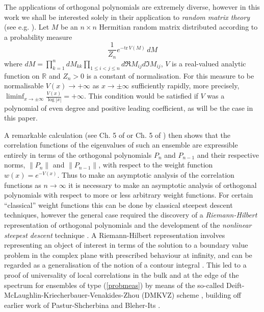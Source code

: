 \documentclass[12pt]{article}
\theoremstyle{definition}
\begin{document}
The applications of orthogonal polynomials are extremely diverse, however in this work we shall be interested solely in their application to \textit{random matrix theory} (see e.g. \cite{deiftbook}). Let $M$ be an $n\times n$ Hermitian random matrix distributed according to a probability measure
\begin{equation}\label{probmeas}
\frac{1}{Z_n} e^{- \mathrm{tr} \, V(M)} \, dM
\end{equation}
where $dM = \prod_{k=1}^n dM_{kk} \prod_{1 \leq i < j \leq n} d \Re M_{ij} d \Im M_{ij}$,  $V$ is a real-valued analytic function on $\mathbb{R}$ and $Z_n > 0$ is a constant of normalisation. For this measure to be normalisable $V(x) \to +\infty$ as $x \to \pm \infty$ sufficiently rapidly,  more precisely, $\liminf_{x \to \pm \infty} \frac{V(x)}{\log|x|} = +\infty$. This condition would be satisfied if $V$ was a polynomial of even degree and positive leading coefficient, as will be the case in this paper. 

A remarkable calculation (see Ch. 5 of \cite{mehta} or Ch. 5 of \cite{loggases}) then shows that the correlation functions of the eigenvalues of such an ensemble are expressible entirely in terms of the orthogonal polynomials $P_n$ and $P_{n-1}$ and their respective norms, $\| P_n \|$ and $\| P_{n-1} \|$, with respect to the weight function $w(x) = e^{-V(x)}$. Thus to make an asymptotic analysis of the correlation functions as $n \to \infty$ it is necessary to make an asymptotic analysis of orthogonal polynomials with respect to more or less arbitrary weight functions. For certain \enquote{classical} weight functions this can be done by classical steepest descent techniques, however the general case required the discovery of a \textit{Riemann-Hilbert} representation of orthogonal polynomials \cite{fokas} and the development of the \textit{nonlinear steepest descent} technique \cite{10.2307/2946540}.  A Riemann-Hilbert representation involves representing an object of interest in terms of the solution to a boundary value problem in the complex plane with prescribed behaviour at infinity, and can be regarded as a generalisation of the notion of a contour integral \cite{itsRH}. This led to a proof of universality of local correlations in the bulk and at the edge of the spectrum for ensembles of type (\ref{probmeas}) by means of the so-called Deift-McLaughlin-Kriecherbauer-Venakides-Zhou (DMKVZ) scheme \cite{deift,deift2,deift3}, building off earlier work of Pastur-Shcherbina \cite{Pastur:1997aa} and Bleher-Its \cite{Its}.
\end{document}

